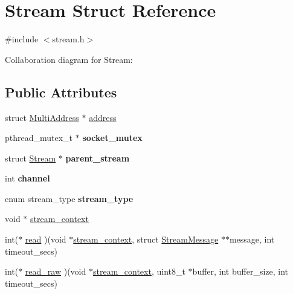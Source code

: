\hypertarget{struct_stream}{}\section{Stream Struct Reference}
\label{struct_stream}


{\ttfamily \#include $<$stream.\+h$>$}



Collaboration diagram for Stream\+:
\subsection*{Public Attributes}
\begin{DoxyCompactItemize}
\item 
struct \mbox{\hyperlink{struct_multi_address}{Multi\+Address}} $\ast$ \mbox{\hyperlink{struct_stream_ad9a082e3fc895a65f41645645f31b595}{address}}
\item 
\mbox{\label{struct_stream_a46b3f79a0db0fdac1e7404b051dd5df0}} 
pthread\+\_\+mutex\+\_\+t $\ast$ {\bfseries socket\+\_\+mutex}
\item 
\mbox{\label{struct_stream_af1c6f3faae170f35a0b393c9c57e191c}} 
struct \mbox{\hyperlink{struct_stream}{Stream}} $\ast$ {\bfseries parent\+\_\+stream}
\item 
\mbox{\label{struct_stream_a3e3d54add259a7f6f9ab58e02c7cff72}} 
int {\bfseries channel}
\item 
\mbox{\label{struct_stream_a211ce3a0b5d436bddc74a73586a2487b}} 
enum stream\+\_\+type {\bfseries stream\+\_\+type}
\item 
void $\ast$ \mbox{\hyperlink{struct_stream_af790417ff01dff00a0109fccc33ca92d}{stream\+\_\+context}}
\item 
int($\ast$ \mbox{\hyperlink{struct_stream_a377ec76a9d98f6db043e05648b4ecfc1}{read}} )(void $\ast$\mbox{\hyperlink{struct_stream_af790417ff01dff00a0109fccc33ca92d}{stream\+\_\+context}}, struct \mbox{\hyperlink{struct_stream_message}{Stream\+Message}} $\ast$$\ast$message, int timeout\+\_\+secs)
\item 
int($\ast$ \mbox{\hyperlink{struct_stream_ac6d37c11cc2f25e3faf08bc9a8127149}{read\+\_\+raw}} )(void $\ast$\mbox{\hyperlink{struct_stream_af790417ff01dff00a0109fccc33ca92d}{stream\+\_\+context}}, uint8\+\_\+t $\ast$buffer, int buffer\+\_\+size, int timeout\+\_\+secs)
$$
\end{DoxyCompactItemize}
